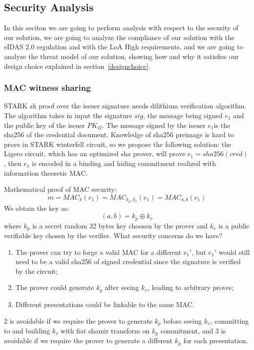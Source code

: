 \documentclass{article}
\begin{document}
\subsection{Security Analysis}
\label{analysis}
In this seciton we are going to perform analysis with respect to the security of our solution, we are going to analyze
the compliance of our solution with the eIDAS 2.0 regulation and with the LoA High requirements, and we are going to analyze 
the threat model of our solution, showing how and why it satisfies our design choice explained in section~\ref{designchoice}.

\subsubsection{MAC witness sharing}
\label{securityanalysis}
STARK zk proof over the issuer signature needs dilithium verification algorithm.
The algorithm takes in input the signature $sig$, the message being signed $e_1$ and 
the public key of the issuer $PK_{II}$.
The message signed by the issuer $e_1$is the sha256 of the credential document. Knowledge
of sha256 preimage is hard to prove in STARK winterfell circuit, so we propose the
following solution: the Ligero circuit, which has an optimized sha prover, will
prove $e_1 = sha256(cred)$, then $e_1$ is encoded in a binding and hiding commitment
realized with information theoretic MAC.

Mathematical proof of MAC security:$$m = MAC_k(e_1) = MAC_{k_p,k_v}(e_1) = MAC_{a,b}(e_1)$$
We obtain the key as:$$(a,b) = k_p \oplus k_v$$ where $k_p$ is a secret random 32 bytes key
choosen by the prover and $k_v$ is a public verifiable key chosen by the verifier.
What security concerns do we have?
\begin{enumerate}
    \item The prover can try to forge a valid MAC for a different $e_1'$, but $e_1'$ would
    still need to be a valid sha256 of signed credential since the signature is verified by the circuit;
    \item The prover could generate $k_p$ after seeing $k_v$, leading to arbitrary proves;
    \item Different presentations could be linkable to the same MAC.
\end{enumerate}
2 is avoidable if we require the prover to generate $k_p$ before seeing $k_v$, committing to 
and building $k_v$ with fiat shamir transform on $k_p$ commitment, and 3 is avoidable if we require the 
prover to generate a different $k_p$ for each presentation.
\end{document}
